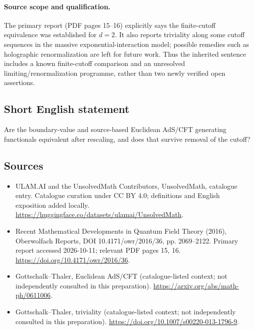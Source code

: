 \documentclass[11pt]{article}
\begin{document}
\paragraph{Source scope and qualification.}
The primary report (PDF pages 15--16) explicitly says the finite-cutoff equivalence was established for $d=2$. It also reports triviality along some cutoff sequences in the massive exponential-interaction model; possible remedies such as holographic renormalization are left for future work. Thus the inherited sentence includes a known finite-cutoff comparison and an unresolved limiting/renormalization programme, rather than two newly verified open assertions.
\subsection{Short English statement}
Are the boundary-value and source-based Euclidean AdS/CFT generating functionals equivalent after rescaling, and does that survive removal of the cutoff?
\subsection{Sources}
\begin{itemize}
\item[\hypertarget{source:statement:1}{S1}] ULAM.AI and the UnsolvedMath Contributors, UnsolvedMath, catalogue entry. Catalogue curation under CC BY 4.0; definitions and English exposition added locally.
\url{https://huggingface.co/datasets/ulamai/UnsolvedMath}.
\item[\hypertarget{source:statement:2}{S2}] Recent Mathematical Developments in Quantum Field Theory (2016), Oberwolfach Reports, DOI 10.4171/owr/2016/36, pp. 2069--2122. Primary report accessed 2026-10-11; relevant PDF pages 15, 16.
\url{https://doi.org/10.4171/owr/2016/36}.
\item[\hypertarget{source:statement:3}{S3}] Gottschalk--Thaler, Euclidean AdS/CFT (catalogue-listed context; not independently consulted in this preparation).
\url{https://arxiv.org/abs/math-ph/0611006}.
\item[\hypertarget{source:statement:4}{S4}] Gottschalk--Thaler, triviality (catalogue-listed context; not independently consulted in this preparation).
\url{https://doi.org/10.1007/s00220-013-1796-9}.
\end{itemize}
\label{end:statement}
\end{document}
